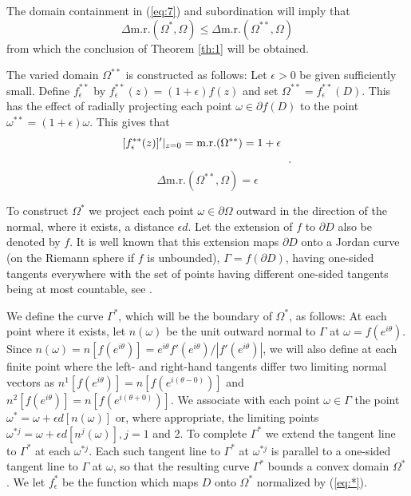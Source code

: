 The domain containment in (\ref{eq:7}) and subordination will imply
that 
\begin{equation}
\label{eq:8}
\Delta\mbox{m.r.}(\Omega^\ast, \Omega)\leq
\Delta\mbox{m.r.}(\Omega^{\ast\ast}, \Omega)
\end{equation}
from which the conclusion of Theorem \ref{th:1} will be obtained.

The varied domain $\Omega^{\ast\ast}$ is constructed as follows: Let
$\epsilon>0$ be given sufficiently small.  Define
$f^{\ast\ast}_\epsilon$ by $f^{\ast\ast}_\epsilon(z)=(1+\epsilon)
f(z)$ and set $\Omega^{\ast\ast}=f^{\ast\ast}_\epsilon (D)$.  This
has the effect of radially projecting each point $\omega\in \partial
f(D)$ to the point $\omega^{\ast\ast}=(1+\epsilon)\omega$.  This gives
that 
\begin{equation}
\label{eq:9}
[f^{\ast\ast}_\epsilon(z)]'|_{z=0} =\mbox{m.r.} (\Omega^{\ast\ast})
=1+\epsilon\ \ \lower 15pt\hbox{.}
\end{equation}
$$\Delta\mbox{m.r.} (\Omega^{\ast\ast}, \Omega)=\epsilon$$

To construct $\Omega^\ast$ we project each point $\omega\in
\partial\Omega$ outward in the direction of the normal, where it
exists, a distance $\epsilon d$.  Let the extension of $f$ to $\partial D$
also be denoted by $f$.  It is well known that this extension maps
$\partial D$ onto a Jordan curve (on the Riemann sphere if $f$ is
unbounded), $\Gamma=f(\partial D)$, having one-sided tangents
everywhere with the set of points having different one-sided tangents
being at most countable, see \cite{8}.

We define the curve $\Gamma^\ast$, which will be the boundary of
$\Omega^\ast$, as follows: At each point where it exists, let
$n(\omega)$ be the unit outward normal to $\Gamma$ at
$\omega=f(e^{i\theta})$.  Since
$n(\omega)=n[f(e^{i\theta})]=e^{i\theta}f'(e^{i\theta}) /|f'(e^{i\theta})|$,
we will also define at each finite point where the left- and
right-hand tangents differ two limiting normal vectors as
$n^1[f(e^{i\theta})]=n[f(e^{i(\theta-0)})]$ and
$n^2[f(e^{i\theta})]=n[f(e^{i(\theta+0)})]$. We associate with each
point $\omega\in \Gamma$ the point $\omega^\ast =\omega+\epsilon
d[n(\omega)]$ or, where appropriate, the limiting points
$\omega^{\ast j}=\omega + \epsilon d [n^j (\omega)], j=1$ and 2.  To
complete $\Gamma^\ast$ we extend the tangent line to $\Gamma^\ast$ at
each $\omega^{\ast j}$.  Each such tangent line to $\Gamma^\ast$ at
$\omega^{\ast j}$ is parallel to a one-sided tangent line to $\Gamma$
at $\omega$, so that the resulting curve $\Gamma^\ast$ bounds a
convex domain $\Omega^\ast$.  We let $f^\ast_\epsilon$ be the
function which maps $D$ onto $\Omega^\ast $ normalized by
(\ref{eq:*}).

